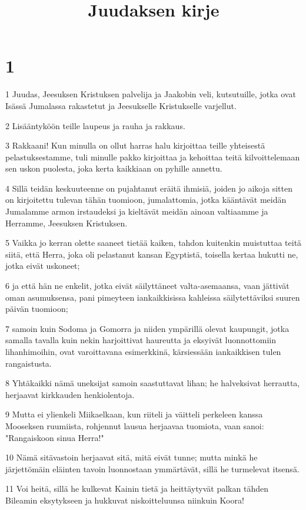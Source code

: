 

\title{Juudaksen kirje}


\chapter{1}

\par 1 Juudas, Jeesuksen Kristuksen palvelija ja Jaakobin veli, kutsutuille, jotka ovat Isässä Jumalassa rakastetut ja Jeesukselle Kristukselle varjellut.
\par 2 Lisääntyköön teille laupeus ja rauha ja rakkaus.
\par 3 Rakkaani! Kun minulla on ollut harras halu kirjoittaa teille yhteisestä pelastuksestamme, tuli minulle pakko kirjoittaa ja kehoittaa teitä kilvoittelemaan sen uskon puolesta, joka kerta kaikkiaan on pyhille annettu.
\par 4 Sillä teidän keskuuteenne on pujahtanut eräitä ihmisiä, joiden jo aikoja sitten on kirjoitettu tulevan tähän tuomioon, jumalattomia, jotka kääntävät meidän Jumalamme armon irstaudeksi ja kieltävät meidän ainoan valtiaamme ja Herramme, Jeesuksen Kristuksen.
\par 5 Vaikka jo kerran olette saaneet tietää kaiken, tahdon kuitenkin muistuttaa teitä siitä, että Herra, joka oli pelastanut kansan Egyptistä, toisella kertaa hukutti ne, jotka eivät uskoneet;
\par 6 ja että hän ne enkelit, jotka eivät säilyttäneet valta-asemaansa, vaan jättivät oman asumuksensa, pani pimeyteen iankaikkisissa kahleissa säilytettäviksi suuren päivän tuomioon;
\par 7 samoin kuin Sodoma ja Gomorra ja niiden ympärillä olevat kaupungit, jotka samalla tavalla kuin nekin harjoittivat haureutta ja eksyivät luonnottomiin lihanhimoihin, ovat varoittavana esimerkkinä, kärsiessään iankaikkisen tulen rangaistusta.
\par 8 Yhtäkaikki nämä uneksijat samoin saastuttavat lihan; he halveksivat herrautta, herjaavat kirkkauden henkiolentoja.
\par 9 Mutta ei ylienkeli Miikaelkaan, kun riiteli ja väitteli perkeleen kanssa Mooseksen ruumiista, rohjennut lausua herjaavaa tuomiota, vaan sanoi: "Rangaiskoon sinua Herra!"
\par 10 Nämä sitävastoin herjaavat sitä, mitä eivät tunne; mutta minkä he järjettömäin eläinten tavoin luonnostaan ymmärtävät, sillä he turmelevat itsensä.
\par 11 Voi heitä, sillä he kulkevat Kainin tietä ja heittäytyvät palkan tähden Bileamin eksytykseen ja hukkuvat niskoitteluunsa niinkuin Koora!
